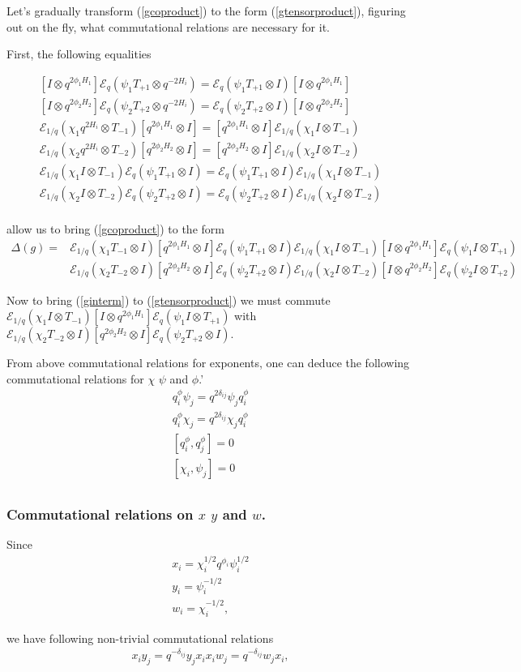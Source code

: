 \documentclass{paper}
\def\be{\begin{eqnarray}}
\def\ee{\end{eqnarray}}
\def\me{\mathcal{E}}
\def\dg{\Delta \lb g \rb}
\def\lb{\left (}
\def\rb{\right )}
\def\lsb{\left [}
\def\rsb{\right ]}
\newcommand{\EchiFirst}[1]{\me_{1/q} \lb\chi_#1 T_{-#1} \otimes I \rb}
\newcommand{\EchiSecond}[1]{\me_{1/q} \lb\chi_#1 I \otimes T_{-#1} \rb}
\newcommand{\EpsiFirst}[1]{\me_{q} \lb\psi_#1 T_{+#1} \otimes I \rb}
\newcommand{\EpsiSecond}[1]{\me_{q} \lb\psi_#1 I \otimes T_{+#1} \rb}
\newcommand{\CartanFirst}[1]{\lsb q^{2\phi_#1 H_#1} \otimes I \rsb}
\newcommand{\CartanSecond}[1]{\lsb I \otimes q^{2\phi_#1 H_#1}  \rsb}
\newcommand{\EchiTwisted}[1]{\me_{1/q} \lb\chi_#1 q^{2H_i} \otimes T_{-#1} \rb}
\newcommand{\EpsiTwisted}[1]{\me_{q} \lb\psi_#1 T_{+#1} \otimes q^{-2H_i} \rb}
\begin{document}
Let's gradually transform (\ref{gcoproduct}) to the form (\ref{gtensorproduct}),
figuring out on the fly, what commutational relations are necessary for it.

First, the following equalities

\be
\CartanSecond{1} \EpsiTwisted{1} = \EpsiFirst{1} \CartanSecond{1} \\
\CartanSecond{2} \EpsiTwisted{2} = \EpsiFirst{2} \CartanSecond{2} \\
\EchiTwisted{1} \CartanFirst{1} = \CartanFirst{1} \EchiSecond{1} \\
\EchiTwisted{2} \CartanFirst{2} = \CartanFirst{2} \EchiSecond{2} \\
\EchiSecond{1} \EpsiFirst{1} = \EpsiFirst{1} \EchiSecond{1} \\
\EchiSecond{2} \EpsiFirst{2} = \EpsiFirst{2} \EchiSecond{2} \\
\ee

allow us to bring (\ref{gcoproduct}) to the form
\be
\dg = & \EchiFirst{1}\CartanFirst{1}\EpsiFirst{1} \EchiSecond{1}\CartanSecond{1}\EpsiSecond{1} & \label{ginterm} \\
& \EchiFirst{2}\CartanFirst{2}\EpsiFirst{2} \EchiSecond{2}\CartanSecond{2}\EpsiSecond{2}
\ee

Now to bring (\ref{ginterm}) to (\ref{gtensorproduct}) we must commute
$\EchiSecond{1}\CartanSecond{1}\EpsiSecond{1}$ with $\EchiFirst{2}\CartanFirst{2}\EpsiFirst{2}$.

From above commutational relations for exponents, one can deduce the following
commutational relations for $\chi$ $\psi$ and $\phi$.'
\be
q^\phi_i \psi_j = q^{2 \delta_{ij}} \psi_j q^\phi_i \\
q^\phi_i \chi_j = q^{2 \delta_{ij}} \chi_j q^\phi_i \\
[q^\phi_i, q^\phi_j] = 0 \\
[\chi_i, \psi_j] = 0 \\
\ee

\subsubsection{Commutational relations on $x$ $y$ and $w$.}

Since
\be
x_i = \chi_i^{1/2} q^{\phi_i} \psi_i^{1/2} \\
y_i = \psi_i^{-1/2} \\
w_i = \chi_i^{-1/2},
\ee

we have following non-trivial commutational relations
\be
x_i y_j = q^{- \delta_{ij}} y_j x_i
x_i w_j = q^{- \delta_{ij}} w_j x_i,
\ee
\end{document}
